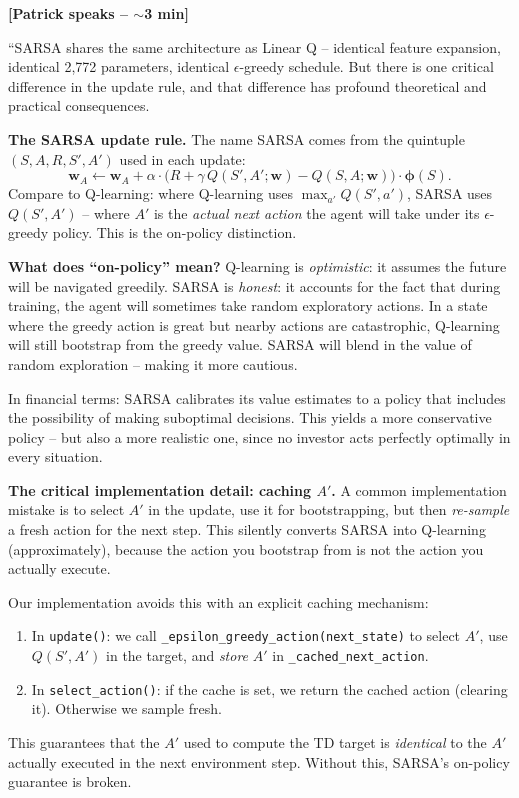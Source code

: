 \documentclass[11pt, letterpaper]{article}
\begin{document}
\textbf{[Patrick speaks -- $\sim$3 min]}

``SARSA shares the same architecture as Linear Q -- identical feature expansion, identical 2,772 parameters, identical $\epsilon$-greedy schedule. But there is one critical difference in the update rule, and that difference has profound theoretical and practical consequences.

\textbf{The SARSA update rule.} The name SARSA comes from the quintuple $(S, A, R, S', A')$ used in each update:
\[
\mathbf{w}_A \leftarrow \mathbf{w}_A + \alpha \cdot \bigl(R + \gamma \, Q(S', A'; \mathbf{w}) - Q(S, A; \mathbf{w})\bigr) \cdot \boldsymbol{\phi}(S).
\]
Compare to Q-learning: where Q-learning uses $\max_{a'} Q(S', a')$, SARSA uses $Q(S', A')$ -- where $A'$ is the \emph{actual next action} the agent will take under its $\epsilon$-greedy policy. This is the on-policy distinction.

\textbf{What does ``on-policy'' mean?} Q-learning is \emph{optimistic}: it assumes the future will be navigated greedily. SARSA is \emph{honest}: it accounts for the fact that during training, the agent will sometimes take random exploratory actions. In a state where the greedy action is great but nearby actions are catastrophic, Q-learning will still bootstrap from the greedy value. SARSA will blend in the value of random exploration -- making it more cautious.

In financial terms: SARSA calibrates its value estimates to a policy that includes the possibility of making suboptimal decisions. This yields a more conservative policy -- but also a more realistic one, since no investor acts perfectly optimally in every situation.

\textbf{The critical implementation detail: caching $A'$.} A common implementation mistake is to select $A'$ in the update, use it for bootstrapping, but then \emph{re-sample} a fresh action for the next step. This silently converts SARSA into Q-learning (approximately), because the action you bootstrap from is not the action you actually execute.

Our implementation avoids this with an explicit caching mechanism:
\begin{enumerate}
\item In \texttt{update()}: we call \texttt{\_epsilon\_greedy\_action(next\_state)} to select $A'$, use $Q(S', A')$ in the target, and \emph{store} $A'$ in \texttt{\_cached\_next\_action}.
\item In \texttt{select\_action()}: if the cache is set, we return the cached action (clearing it). Otherwise we sample fresh.
\end{enumerate}
This guarantees that the $A'$ used to compute the TD target is \emph{identical} to the $A'$ actually executed in the next environment step. Without this, SARSA's on-policy guarantee is broken.
\end{document}
